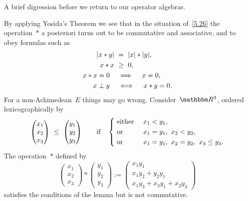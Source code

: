 \documentclass[main.tex]{subfiles}
\begin{document}
\begin{psec}{5.17}%
A brief digression before we return to our operator algebras.

By applying Yosida's Theorem we see that
in the situation of~\ref{5.26}
the operation~$*$ a posteriori
turns out to be commutative and associative,
and to obey formulas such as
\begin{alignat*}{2}
|x*y|\ &=\ |x|*|y|\htam{,} \\
x*x \ &\geq\ 0\htam{,} \\
x*x=0\quad&\implies\quad x=0\htam{,} \\
x\perp y\quad&\iff\quad x*y=0\htam{.}
\end{alignat*}
For a non-Achimedean~$E$
things may go wrong.
Consider~$\R^3$,
ordered lexicographically by
\begin{equation*}
\begin{pmatrix}x_1 \\ x_2 \\ x_3\end{pmatrix}
\ \leq\ 
\begin{pmatrix}y_1 \\ y_2 \\ y_3\end{pmatrix}
\qquad\htam{if}\quad
\left\{\ 
\begin{aligned}
&\htam{either }&&x_1<y_1\htam{,} \\
&\htam{or } &&x_1=y_1,\ x_2<y_2\htam{,} \\
&\htam{or } &&x_1=y_1,\ x_2=y_2,\ x_3\leq y_3\htam{.}
\end{aligned}
\right.
\end{equation*}
The operation~$*$ defined by
\begin{equation*}
\begin{pmatrix} x_1 \\ x_2 \\ x_3 \end{pmatrix}
* 
\begin{pmatrix} y_1 \\ y_2 \\ y_3 \end{pmatrix}
:= 
\left(
\begin{array}{l}
x_1 y_1 \\
x_1 y_2 + y_2 y_1 \\
x_1 y_3 + x_3 y_1 + x_2 y_3
\end{array}
\right)
\end{equation*}
satisfies the conditions of the lemma
but is not commutative.
\end{psec}
\end{document}
